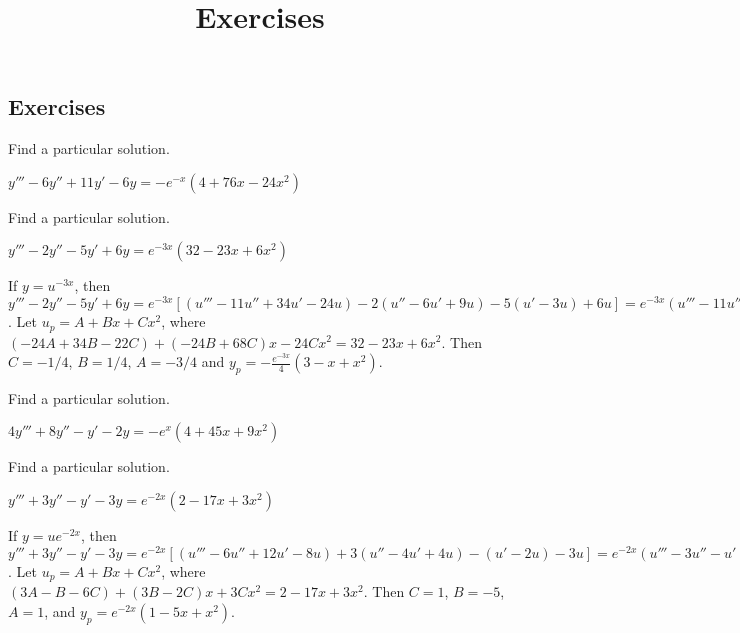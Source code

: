\documentclass{ximera}
\title{Exercises} \license{CC BY-NC-SA 4.0}
\begin{document}
\begin{abstract}
\end{abstract}
\maketitle

\begin{onlineOnly}
\section*{Exercises}
\end{onlineOnly}




\begin{problem}\label{exer:9.3.1}   Find a particular solution.  

$y'''-6y''+11y'-6y=-e^{-x}(4+76x-24x^2)$
\end{problem}

\begin{problem}\label{exer:9.3.2}   Find a particular solution. 

$y'''-2y''-5y'+6y=e^{-3x}(32-23x+6x^2)$

\begin{solution}
If $y=u^{-3x}$, then $y'''-2y''-5y'+6y=e^{-3x}[
(u'''-11u''+34u'-24u)-2(u''-6u'+9u)-5(u'-3u)+6u]
=e^{-3x}(u'''-11u''+34u'-24u)$. Let $u_p=A+Bx+Cx^2$, where
$(-24A+34B-22C)+(-24B+68C)x-24Cx^2=32-23x+6x^2$. Then $C=-1/4$,
$B=1/4$, $A=-3/4$ and $y_p=-\frac{e^{-3x}}{4}(3-x+x^2)$.
\end{solution}
\end{problem}

\begin{problem}\label{exer:9.3.3}   Find a particular solution.  

$4y'''+8y''-y'-2y=-e^x(4+45x+9x^2)$
\end{problem}

\begin{problem}\label{exer:9.3.4}   Find a particular solution. 

$y'''+3y''-y'-3y=e^{-2x}(2-17x+3x^2)$

\begin{solution}
If $y=ue^{-2x}$, then $y'''+3y''-y'-3y=e^{-2x}[
(u'''-6u''+12u'-8u)+ 3(u''-4u'+4u) -(u'-2u) -3u]
=e^{-2x}(u'''-3u''-u'+3u)$. Let $u_p=A+Bx+Cx^2$, where $(3A-B-6C)+
(3B-2C)x +3Cx^2=2-17x+3x^2$. Then $C=1$, $B=-5$, $A=1$, and
$y_p=e^{-2x}(1-5x+x^2)$.
\end{solution}
\end{problem}
\end{document}
